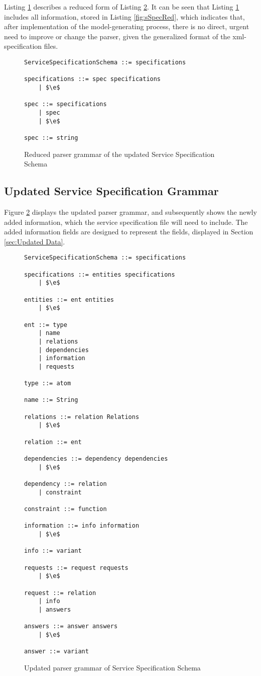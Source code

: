 Listing \ref{fig:sSpecUpdRed} describes a reduced form of Listing \ref{fig:sSpecUpd}. It can be seen that Listing \ref{fig:sSpecUpdRed} includes all information, stored in Listing \ref{fig:sSpecRed}, which indicates that, after implementation of the model-generating process, there is no direct, urgent need to improve or change the parser, given the generalized format of the xml-specification files.

\begin{figure}[h]
	\centering
	\begin{lstlisting}[keywordstyle={}]
ServiceSpecificationSchema ::= specifications

specifications ::= spec specifications
    | $\e$
     
spec ::= specifications
    | spec
    | $\e$

spec ::= string
	\end{lstlisting}
	\caption{Reduced parser grammar of the updated Service Specification Schema}
	\label{fig:sSpecUpdRed}
\end{figure}

\subsection{Updated Service Specification Grammar}

Figure \ref{fig:sSpecUpd} displays the updated parser grammar, and subsequently shows the newly added information, which the service specification file will need to include. The added information fields are designed to represent the fields, displayed in Section \ref{sec:Updated Data}.

\begin{figure}
	\centering
	\begin{lstlisting}[keywordstyle={}]
ServiceSpecificationSchema ::= specifications

specifications ::= entities specifications
    | $\e$
     
entities ::= ent entities
    | $\e$

ent ::= type
    | name
    | relations
    | dependencies
    | information
    | requests

type ::= atom

name ::= String

relations ::= relation Relations
    | $\e$

relation ::= ent

dependencies ::= dependency dependencies
    | $\e$

dependency ::= relation
    | constraint

constraint ::= function

information ::= info information
    | $\e$

info ::= variant

requests ::= request requests
    | $\e$

request ::= relation
    | info
    | answers

answers ::= answer answers
    | $\e$

answer ::= variant
	\end{lstlisting}
	\caption{Updated parser grammar of Service Specification Schema}
	\label{fig:sSpecUpd}
\end{figure}

